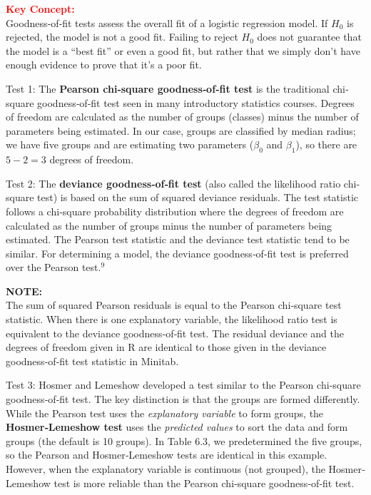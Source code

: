 \documentclass[
]{report}
\begin{document}
\large

\textbf{\textcolor{red}{Key Concept:}}\\
\color{red}
Goodness‐of‐fit tests assess the overall fit of a logistic regression model. If \(H_0\) is rejected, the model is not a good fit. Failing to reject \(H_0\) does not guarantee that the model is a ``best fit'' or even a good fit, but rather that we simply don't have enough evidence to prove that it's a poor fit.\\
\color{black}
\normalsize

Test 1: The \textbf{Pearson chi‐square goodness‐of‐fit test} is the traditional chi‐square goodness‐of‐fit test seen in many introductory statistics courses. Degrees of freedom are calculated as the number of groups (classes) minus the number of parameters being estimated. In our case, groups are classified by median radius; we have five groups and are estimating two parameters (\(\beta_0\) and \(\beta_1\)), so there are \(5 - 2 = 3\) degrees of freedom.

Test 2: The \textbf{deviance goodness‐of‐fit test} (also called the likelihood ratio chi‐square test) is based on the sum of squared deviance residuals. The test statistic follows a chi‐square probability distribution where the degrees of freedom are calculated as the number of groups minus the number of parameters being estimated. The Pearson test statistic and the deviance test statistic tend to be similar. For determining a model, the deviance goodness‐of‐fit test is preferred over the Pearson test.\(^9\)

\large

\textbf{NOTE:}\\
The sum of squared Pearson residuals is equal to the Pearson chi‐square test statistic. When there is one explanatory variable, the likelihood ratio test is equivalent to the deviance goodness‐of‐fit test. The residual deviance and the degrees of freedom given in R are identical to those given in the deviance goodness‐of‐fit test statistic in Minitab.\\
\normalsize

Test 3: Hosmer and Lemeshow developed a test similar to the Pearson chi‐square goodness‐of‐fit test. The key distinction is that the groups are formed differently. While the Pearson test uses the \emph{explanatory variable} to form groups, the \textbf{Hosmer‐Lemeshow test} uses the \emph{predicted values} to sort the data and form groups (the default is 10 groups). In Table 6.3, we predetermined the five groups, so the Pearson and Hosmer‐Lemeshow tests are identical in this example. However, when the explanatory variable is continuous (not grouped), the Hosmer‐Lemeshow test is more reliable than the Pearson chi‐square goodness‐of‐fit test.
\end{document}
